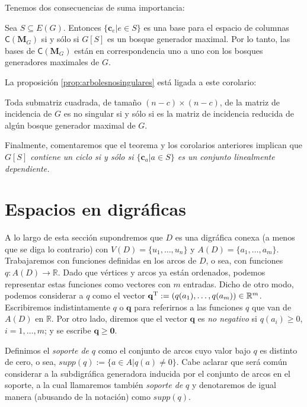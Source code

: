  Tenemos dos consecuencias de suma importancia:
 
\begin{cor} Sea
$S\subseteq E(G)$. Entonces $\{\mathbf{c}_{e} | e \in S\}$ es una base para el espacio de columnas $\mathsf{C}(\mathbf{M}_{G})$ si y sólo si $G[S]$ es un bosque generador maximal. Por lo tanto, las bases de $\mathsf{C}(\mathbf{M}_{G})$ están en correspondencia uno a uno con los bosques generadores maximales de $G$.
\end{cor} 

La proposición \ref{prop:arbolesnosingulares} está ligada a este corolario:

\begin{cor}
Toda submatriz cuadrada, de tamaño $(n-c) \times (n-c)$, de la matriz de incidencia de $G$ es no singular si y sólo si es la matriz de incidencia reducida de algún bosque generador maximal de $G$.
\end{cor}
 
Finalmente, comentaremos que el teorema y los corolarios anteriores implican que \textit{$G[S]$ contiene un ciclo si y sólo si $\{\mathbf{c}_{a} | a \in S\}$ es un conjunto linealmente dependiente.} 



\section{Espacios en digráficas}
A lo largo de esta sección supondremos que $D$ es una digráfica conexa (a menos que se diga lo contrario) con $V(D) = \{u_{1}, \ldots, u_{n}\}$ y $A(D)= \{ a_{1}, \ldots, a_{m}\}$. Trabajaremos con funciones definidas en los arcos de $D$, o sea, con funciones $q \colon A(D) \rightarrow \mathbb{R}$. Dado que vértices y arcos ya están ordenados, podemos representar estas funciones como vectores con $m$ entradas. Dicho de otro modo, podemos considerar a $q$ como el vector $\mathbf{q}^{\textnormal{T}} := (q(a_{1}), \ldots, q(a_{m})) \in \mathbb{R}^{m}$. Escribiremos indistintamente $q$ o $\mathbf{q}$ para referirnos a las funciones $q$ que van de $A(D)$ en $\mathbb{R}$. Por otro lado, diremos que el vector $\mathbf{q}$ es \textit{no negativo} si $q(a_{i}) \geq 0$, $i = 1, \ldots, m$; y se escribe $\mathbf{q} \geq \mathbf{0}$.

Definimos el \textit{soporte de} $q$ como el conjunto de arcos cuyo valor bajo $q$ es distinto de cero, o sea, $
supp(q) := \{a \in A | q(a) \neq 0\}.$ Cabe aclarar que será común considerar a la subdigráfica generadora inducida por el conjunto de arcos en el soporte, a la cual llamaremos también \textit{soporte de} $q$ y denotaremos de igual manera (abusando de la notación) como $supp(q)$.
 
